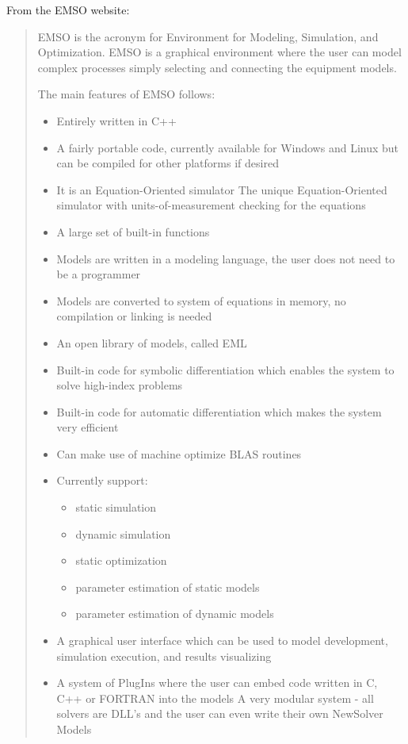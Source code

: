 From the EMSO website:
\begin{quote}
EMSO is the acronym for Environment for Modeling, Simulation, and Optimization. 
EMSO is a graphical environment where the user can model complex processes simply selecting and connecting the equipment models. 

The main features of EMSO follows: 

\begin{itemize}
\item Entirely written in C++
\item A fairly portable code, currently
  available for Windows and Linux but can be compiled for other
  platforms if desired
\item It is an Equation-Oriented simulator The unique
  Equation-Oriented simulator with units-of-measurement checking for
  the equations
\item A large set of built-in functions
\item Models are written
  in a modeling language, the user does not need to be a programmer

\item Models are converted to system of equations in memory, no
  compilation or linking is needed
\item An open library of models, called
  EML
\item Built-in code for symbolic differentiation which enables the
  system to solve high-index problems
\item Built-in code for automatic
  differentiation which makes the system very efficient
\item Can make use
  of machine optimize BLAS routines
\item Currently support: 
  \begin{itemize}
  \item static simulation
  \item dynamic simulation
  \item static optimization
  \item parameter estimation of static models
  \item parameter estimation of
    dynamic models
  \end{itemize}
\item A
  graphical user interface which can be used to model development,
  simulation execution, and results visualizing
\item A system of PlugIns where the user can embed code written in C,
  C++ or FORTRAN into the models A very modular system - all solvers
  are DLL's and the user can even write their own NewSolver Models
\end{itemize}
\end{quote}

